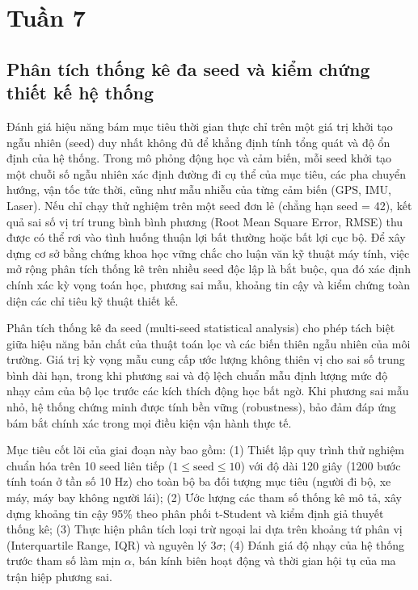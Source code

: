 \section{Tuần 7}

\subsection{Phân tích thống kê đa seed và kiểm chứng thiết kế hệ thống}

\hspace{0.5cm} Đánh giá hiệu năng bám mục tiêu thời gian thực chỉ trên một giá trị khởi tạo ngẫu nhiên (seed) duy nhất không đủ để khẳng định tính tổng quát và độ ổn định của hệ thống. Trong mô phỏng động học và cảm biến, mỗi seed khởi tạo một chuỗi số ngẫu nhiên xác định đường đi cụ thể của mục tiêu, các pha chuyển hướng, vận tốc tức thời, cũng như mẫu nhiễu của từng cảm biến (GPS, IMU, Laser). Nếu chỉ chạy thử nghiệm trên một seed đơn lẻ (chẳng hạn seed = 42), kết quả sai số vị trí trung bình bình phương (Root Mean Square Error, RMSE) thu được có thể rơi vào tình huống thuận lợi bất thường hoặc bất lợi cục bộ. Để xây dựng cơ sở bằng chứng khoa học vững chắc cho luận văn kỹ thuật máy tính, việc mở rộng phân tích thống kê trên nhiều seed độc lập là bắt buộc, qua đó xác định chính xác kỳ vọng toán học, phương sai mẫu, khoảng tin cậy và kiểm chứng toàn diện các chỉ tiêu kỹ thuật thiết kế.

Phân tích thống kê đa seed (multi-seed statistical analysis) cho phép tách biệt giữa hiệu năng bản chất của thuật toán lọc và các biến thiên ngẫu nhiên của môi trường. Giá trị kỳ vọng mẫu cung cấp ước lượng không thiên vị cho sai số trung bình dài hạn, trong khi phương sai và độ lệch chuẩn mẫu định lượng mức độ nhạy cảm của bộ lọc trước các kích thích động học bất ngờ. Khi phương sai mẫu nhỏ, hệ thống chứng minh được tính bền vững (robustness), bảo đảm đáp ứng bám bắt chính xác trong mọi điều kiện vận hành thực tế.

Mục tiêu cốt lõi của giai đoạn này bao gồm: (1) Thiết lập quy trình thử nghiệm chuẩn hóa trên 10 seed liên tiếp ($1 \le \text{seed} \le 10$) với độ dài 120 giây (1200 bước tính toán ở tần số 10 Hz) cho toàn bộ ba đối tượng mục tiêu (người đi bộ, xe máy, máy bay không người lái); (2) Ước lượng các tham số thống kê mô tả, xây dựng khoảng tin cậy 95\% theo phân phối t-Student và kiểm định giả thuyết thống kê; (3) Thực hiện phân tích loại trừ ngoại lai dựa trên khoảng tứ phân vị (Interquartile Range, IQR) và nguyên lý $3\sigma$; (4) Đánh giá độ nhạy của hệ thống trước tham số làm mịn $\alpha$, bán kính biên hoạt động và thời gian hội tụ của ma trận hiệp phương sai.

